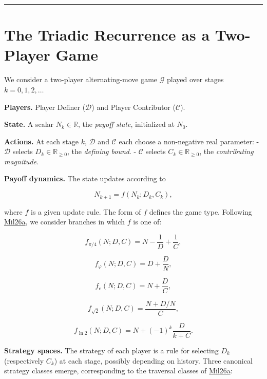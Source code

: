 \documentclass[12pt]{article}
\begin{document}
\begin{center}\rule{0.5\linewidth}{0.5pt}\end{center}

\section{The Triadic Recurrence as a Two-Player Game}\label{the-triadic-recurrence-as-a-two-player-game}

We consider a two-player alternating-move game \(\mathcal{G}\) played
over stages \(k = 0, 1, 2, \ldots\)

\textbf{Players.} Player Definer (\(\mathcal{D}\)) and Player
Contributor (\(\mathcal{C}\)).

\textbf{State.} A scalar \(N_k \in \mathbb{R}\), the \emph{payoff
state}, initialized at \(N_0\).

\textbf{Actions.} At each stage \(k\), \(\mathcal{D}\) and
\(\mathcal{C}\) each choose a non-negative real parameter: -
\(\mathcal{D}\) selects \(D_k \in \mathbb{R}_{\geq 0}\), the
\emph{defining bound}. - \(\mathcal{C}\) selects
\(C_k \in \mathbb{R}_{\geq 0}\), the \emph{contributing magnitude}.

\textbf{Payoff dynamics.} The state updates according to

\[N_{k+1} = f(N_k; D_k, C_k),\]

where \(f\) is a given update rule. The form of \(f\) defines the game
type. Following
\href{https://github.com/baardev/truevalue/blob/main/docnav/Research/papers/1_recursive-tholonic-five-constants/1_recursive-tholonic-five-constants.pdf}{Mil26a},
we consider branches in which \(f\) is one of:

\[f_{\pi/4}(N; D, C) = N - \frac{1}{D} + \frac{1}{C},\]

\[f_{\varphi}(N; D, C) = D + \frac{D}{N},\]

\[f_{e}(N; D, C) = N + \frac{D}{C},\]

\[f_{\sqrt{2}}(N; D, C) = \frac{N + D/N}{C},\]

\[f_{\ln 2}(N; D, C) = N + (-1)^k \frac{D}{k + C}.\]

\textbf{Strategy spaces.} The strategy of each player is a rule for
selecting \(D_k\) (respectively \(C_k\)) at each stage, possibly
depending on history. Three canonical strategy classes emerge,
corresponding to the traversal classes of
\href{https://github.com/baardev/truevalue/blob/main/docnav/Research/papers/1_recursive-tholonic-five-constants/1_recursive-tholonic-five-constants.pdf}{Mil26a}:
\end{document}
